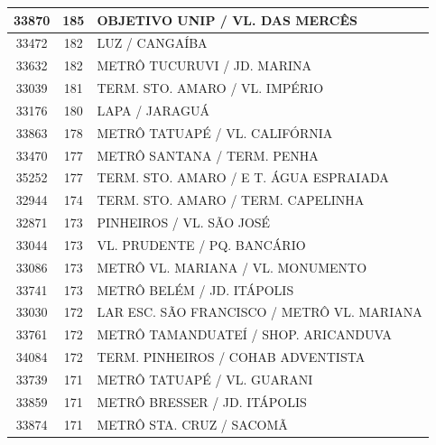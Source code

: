 \documentclass[
	12pt,				%
	oneside,			%
	a4paper,			%
	english,			%
	brazil				%
	]{abntex2ppgsi}
\begin{document}
{{\begin{apendicesenv}
\begin{longtable}{c|c|p{7cm}}
    33870 & 185   & OBJETIVO UNIP / VL. DAS MERCÊS \\
\hline

    33472 & 182   & LUZ / CANGAÍBA \\
\hline

    33632 & 182   & METRÔ TUCURUVI / JD. MARINA \\
\hline

    33039 & 181   & TERM. STO. AMARO / VL. IMPÉRIO \\
\hline

    33176 & 180   & LAPA / JARAGUÁ \\
\hline

    33863 & 178   & METRÔ TATUAPÉ / VL. CALIFÓRNIA \\
\hline

    33470 & 177   & METRÔ SANTANA / TERM. PENHA \\
\hline

    35252 & 177   & TERM. STO. AMARO / E T. ÁGUA ESPRAIADA \\
\hline

    32944 & 174   & TERM. STO. AMARO / TERM. CAPELINHA \\
\hline

    32871 & 173   & PINHEIROS / VL. SÃO JOSÉ \\
\hline

    33044 & 173   & VL. PRUDENTE / PQ. BANCÁRIO \\
\hline

    33086 & 173   & METRÔ VL. MARIANA / VL. MONUMENTO \\
\hline

    33741 & 173   & METRÔ BELÉM / JD. ITÁPOLIS \\
\hline

    33030 & 172   & LAR ESC. SÃO FRANCISCO / METRÔ VL. MARIANA \\
\hline

    33761 & 172   & METRÔ TAMANDUATEÍ / SHOP. ARICANDUVA \\
\hline

    34084 & 172   & TERM. PINHEIROS / COHAB ADVENTISTA \\
\hline

    33739 & 171   & METRÔ TATUAPÉ / VL. GUARANI \\
\hline

    33859 & 171   & METRÔ BRESSER / JD. ITÁPOLIS \\
\hline

    33874 & 171   & METRÔ STA. CRUZ / SACOMÃ \\
\hline


\end{longtable}
\end{apendicesenv}}}
\end{document}
